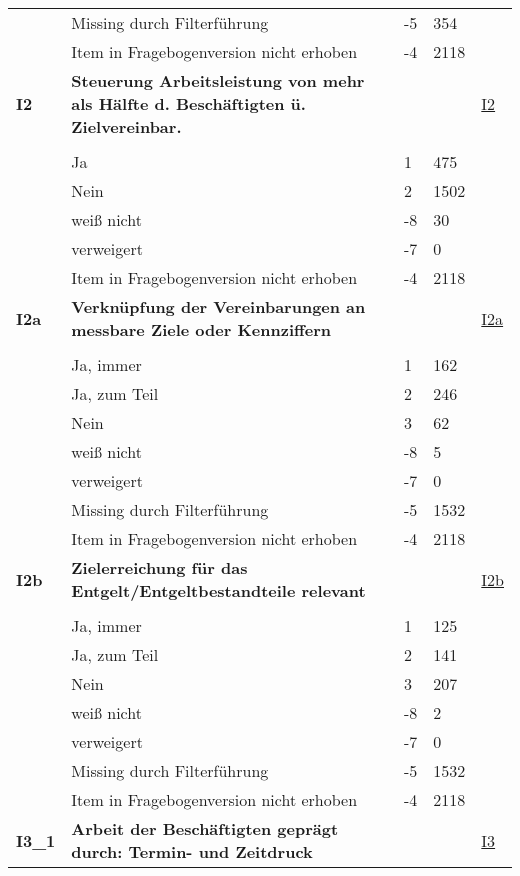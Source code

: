 \begin{longtable}{| L{2.5cm} | L{8.25cm}| C{1.5cm} | R{1.25cm} | C{2.25cm} |  }
   & Missing durch Filterführung & -5 & 354 &  \\ 
   & Item in Fragebogenversion nicht erhoben & -4 & 2118 &  \\ 
   \midrule
\textbf{I2}\label{var:suf:I2} & \textbf{Steuerung Arbeitsleistung von mehr als Hälfte d. Beschäftigten ü. Zielvereinbar.} &  &  & \hyperref[I2]{I2} \\ 
   &  &  &  &  \\ 
   & Ja & 1 & 475 &  \\ 
   & Nein & 2 & 1502 &  \\ 
   & weiß nicht & -8 & 30 &  \\ 
   & verweigert & -7 & 0 &  \\ 
   & Item in Fragebogenversion nicht erhoben & -4 & 2118 &  \\ 
   \midrule
\textbf{I2a}\label{var:suf:I2a} & \textbf{Verknüpfung der Vereinbarungen an messbare Ziele oder Kennziffern} &  &  & \hyperref[I2a]{I2a} \\ 
   &  &  &  &  \\ 
   & Ja, immer & 1 & 162 &  \\ 
   & Ja, zum Teil & 2 & 246 &  \\ 
   & Nein & 3 & 62 &  \\ 
   & weiß nicht & -8 & 5 &  \\ 
   & verweigert & -7 & 0 &  \\ 
   & Missing durch Filterführung & -5 & 1532 &  \\ 
   & Item in Fragebogenversion nicht erhoben & -4 & 2118 &  \\ 
   \midrule
\textbf{I2b}\label{var:suf:I2b} & \textbf{Zielerreichung für das Entgelt/Entgeltbestandteile relevant} &  &  & \hyperref[I2b]{I2b} \\ 
   &  &  &  &  \\ 
   & Ja, immer & 1 & 125 &  \\ 
   & Ja, zum Teil & 2 & 141 &  \\ 
   & Nein & 3 & 207 &  \\ 
   & weiß nicht & -8 & 2 &  \\ 
   & verweigert & -7 & 0 &  \\ 
   & Missing durch Filterführung & -5 & 1532 &  \\ 
   & Item in Fragebogenversion nicht erhoben & -4 & 2118 &  \\ 
   \midrule
\textbf{I3\_1}\label{var:suf:I3:1} & \textbf{Arbeit der Beschäftigten geprägt durch: Termin- und Zeitdruck} &  &  & \hyperref[I3]{I3} \\ 

\end{longtable}
